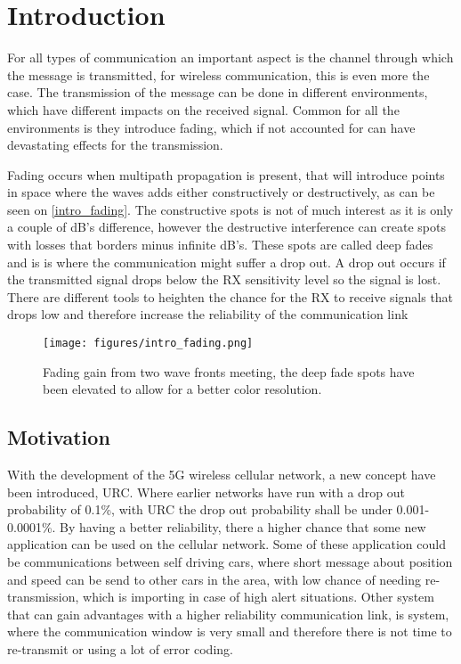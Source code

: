 \chapter{Introduction}

%

For all types of communication an important aspect is the channel through which the message is transmitted, for wireless communication, this is even more the case. The transmission of the message can be done in different environments, which have different impacts on the received signal. Common for all the environments is they introduce fading, which if not accounted for can have devastating effects for the transmission. 

Fading occurs when multipath propagation is present, that will introduce points in space where the waves adds either constructively or destructively, as can be seen on \autoref{intro_fading}. The constructive spots is not of much interest as it is only a couple of dB's difference, however the destructive interference can create spots with losses that borders minus infinite dB's. These spots are called deep fades and is is where the communication might suffer a drop out. A drop out occurs if the transmitted signal drops below the RX sensitivity level so the signal is lost. There are different tools to heighten the chance for the RX to receive signals that drops low and therefore increase the reliability of the communication link


\begin{figure}[H]
\centering
\texttt{[image: figures/intro\_fading.png]}
\caption{Fading gain from two wave fronts meeting, the deep fade spots have been elevated to allow for a better color resolution.}
\label{intro_fading}
\end{figure}

\section{Motivation}
With the development of the 5G wireless cellular network, a new concept have been introduced, \gls{URC}. Where earlier networks have run with a drop out probability of 0.1\%, with URC the drop out probability shall be under 0.001-0.0001\%. By having a better reliability, there a higher chance that some new application can be used on the cellular network. 
Some of these application could be communications between self driving cars, where short message about position and speed can be send to other cars in the area, with low chance of needing re-transmission, which is importing in case of high alert situations. Other system that can gain advantages with a higher reliability communication link, is system, where the communication window is very small and therefore there is not time to re-transmit or using a lot of error coding.


